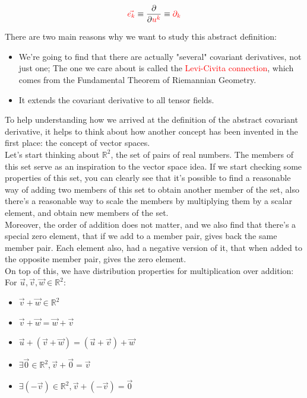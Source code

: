 \begin{equation}
    \begingroup\color{red}\vec{e_k}\endgroup \equiv \frac{\partial}{\partial \begingroup\color{red}u^k\endgroup} \equiv \begingroup\color{red}\partial_k\endgroup
\end{equation}

There are two main reasons why we want to study this abstract definition:

\begin{itemize}
    \item We're going to find that there are actually "several" covariant derivatives, not just one; The one we care about is called the \textcolor{red}{Levi-Civita connection}, which comes from the Fundamental Theorem of Riemannian Geometry.
    \item It extends the covariant derivative to all tensor fields.
\end{itemize}

To help understanding how we arrived at the definition of the abstract covariant derivative, it helps to think about how another concept has been invented in the first place: the concept of 
vector spaces.\\

Let's start thinking about $\mathbb{R}^2$, the set of pairs of real numbers. The members of this set serve as an inspiration to the vector space idea.
If we start checking some properties of this set, you can clearly see that it's possible to find a reasonable way of adding two members of this set to obtain another
member of the set, also there's a reasonable way to scale the members by multiplying them by a scalar element, and obtain new members of the set.\\

Moreover, the order of addition does not matter, and we also find that there's a special zero element, that if we add to a member pair, gives back 
the same member pair. Each element also, had a negative version of it, that when added to the opposite member pair, gives the zero element.\\

On top of this, we have distribution properties for multiplication over addition:\\
For $\vec{u}, \vec{v}, \vec{w} \in \mathbb{R}^2$:
\begin{itemize}
    \item $\vec{v} + \vec{w} \in \mathbb{R}^2$
    \item $\vec{v} + \vec{w} = \vec{w} + \vec{v}$
    \item $\vec{u} + (\vec{v} + \vec{w}) = (\vec{u} + \vec{v}) + \vec{w}$
    \item $\exists \vec{0} \in \mathbb{R}^2 , \vec{v} + \vec{0} = \vec{v}$
    \item $\exists(-\vec{v}) \in \mathbb{R}^2 , \vec{v} + (-\vec{v}) = \vec{0}$
\end{itemize}

